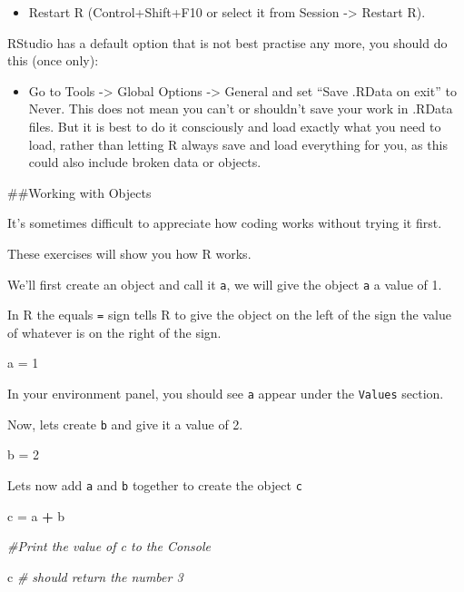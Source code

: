 \documentclass[]{book}
\makeatletter
\newenvironment{Shaded}{\begin{snugshade}}{\end{snugshade}}
\newcommand{\CommentTok}[1]{\textcolor[rgb]{0.56,0.35,0.01}{\textit{#1}}}
\newcommand{\DecValTok}[1]{\textcolor[rgb]{0.00,0.00,0.81}{#1}}
\newcommand{\NormalTok}[1]{#1}
\newcommand{\OperatorTok}[1]{\textcolor[rgb]{0.81,0.36,0.00}{\textbf{#1}}}
\newcommand{\StringTok}[1]{\textcolor[rgb]{0.31,0.60,0.02}{#1}}
\providecommand{\tightlist}{%
  \setlength{\itemsep}{0pt}\setlength{\parskip}{0pt}}
\newenvironment{kframe}{%
\medskip{}
\setlength{\fboxsep}{.8em}
 \def\at@end@of@kframe{}%
 \ifinner\ifhmode%
  \def\at@end@of@kframe{\end{minipage}}%
  \begin{minipage}{\columnwidth}%
 \fi\fi%
 \def\FrameCommand##1{\hskip\@totalleftmargin \hskip-\fboxsep
 \colorbox{shadecolor}{##1}\hskip-\fboxsep
     \hskip-\linewidth \hskip-\@totalleftmargin \hskip\columnwidth}%
 \MakeFramed {\advance\hsize-\width
   \@totalleftmargin\z@ \linewidth\hsize
   \@setminipage}}%
 {\par\unskip\endMakeFramed%
 \at@end@of@kframe}
\renewenvironment{Shaded}{\begin{kframe}}{\end{kframe}}
\theoremstyle{definition}
\theoremstyle{definition}
\theoremstyle{definition}
\theoremstyle{remark}
\makeatother
\begin{document}
\begin{itemize}
\tightlist
\item
  Restart R (Control+Shift+F10 or select it from Session -\textgreater{}
  Restart R).
\end{itemize}

RStudio has a default option that is not best practise any more, you
should do this (once only):

\begin{itemize}
\tightlist
\item
  Go to Tools -\textgreater{} Global Options -\textgreater{} General and
  set ``Save .RData on exit'' to Never. This does not mean you can't or
  shouldn't save your work in .RData files. But it is best to do it
  consciously and load exactly what you need to load, rather than
  letting R always save and load everything for you, as this could also
  include broken data or objects.
\end{itemize}

\#\#Working with Objects

It's sometimes difficult to appreciate how coding works without trying
it first.

These exercises will show you how R works.

We'll first create an object and call it \texttt{a}, we will give the
object \texttt{a} a value of 1.

In R the equals \texttt{=} sign tells R to give the object on the left
of the sign the value of whatever is on the right of the sign.

\begin{Shaded}
\begin{Highlighting}[]
\NormalTok{a =}\StringTok{ }\DecValTok{1}
\end{Highlighting}
\end{Shaded}

In your environment panel, you should see \texttt{a} appear under the
\texttt{Values} section.

Now, lets create \texttt{b} and give it a value of 2.

\begin{Shaded}
\begin{Highlighting}[]
\NormalTok{b =}\StringTok{ }\DecValTok{2}
\end{Highlighting}
\end{Shaded}

Lets now add \texttt{a} and \texttt{b} together to create the object
\texttt{c}

\begin{Shaded}
\begin{Highlighting}[]
\NormalTok{c =}\StringTok{ }\NormalTok{a }\OperatorTok{+}\StringTok{ }\NormalTok{b }

\CommentTok{#Print the value of c to the Console}

\NormalTok{c }\CommentTok{# should return the number 3}
\end{Highlighting}
\end{Shaded}
\end{document}
